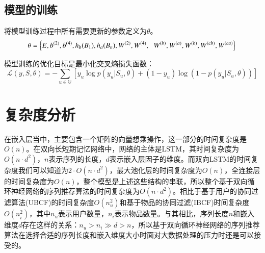 \subsection{模型的训练}

将模型训练过程中所有需要更新的参数定义为$\theta $。
\begin{equation}
\theta=  \left \{ E,b^{(2)},b^{(4)},h_{b}(B_{1}),h_{a}(B_{n}),W^{(2)}, W^{(4)},\right.\\
\left.W^{(b)},W^{(a)},W^{(b)},W^{(cb)},W^{(ca)} \right \} \\
\end{equation}

模型训练的优化目标是最小化交叉熵损失函数：
\begin{equation}
\mathcal{L}(y,S,\theta )=-\sum_{u\in \mathbb{U}}[y_{u}\log p(y_{u}|S_{u},\theta)+(1-y_{u})\log (1-p(y_{u}|S_{u},\theta ))]
\end{equation}

\section{复杂度分析}

在嵌入层当中，主要包含一个矩阵的向量想乘操作，这一部分的时间复杂度是$O(n)$。在双向长短期记忆网络中，网络的主体是LSTM，其时间复杂度为$O(n\cdot d^{2})$，$n$表示序列的长度，$d$表示嵌入层因子的维度。而双向LSTM的时间复杂度我们可以知道为$2\cdot O(n\cdot d^{2})$，最大池化层的时间复杂度为$O(n)$，全连接层的时间复杂度为$O(n)$，整个模型是上述这些结构的串联，所以整个基于双向循环神经网络的序列推荐算法的时间复杂度为$O(n\cdot d^{2})$。相比于基于用户的协同过滤算法(UBCF)的时间复杂度$O(n_{u}^{2})$和基于物品的协同过滤(IBCF)时间复杂度$O(n_{i}^{2})$，其中$n_{u}$表示用户数量，$n_{i}$表示物品数量。与其相比，序列长度$n$和嵌入维度$d$存在这样的关系：$n_{u}> n_{i}\gg d> n$，所以基于双向循环神经网络的序列推荐算法在选择合适的序列长度和嵌入维度大小时面对大数据处理的压力时还是可以接受的。

